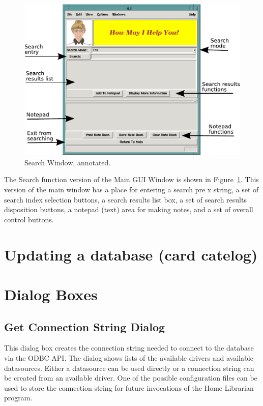 \begin{figure}[hpt]
\begin{centering}
\includegraphics[width=5in]{SearchWindowAnnotated.pdf}
\caption{Search Window, annotated.}
\label{fig:ref:searchwindowAnno}
\end{centering}
\end{figure}
The Search function version of the Main GUI Window is shown in
Figure~\ref{fig:ref:searchwindowAnno}. This version of the main window has
a place for entering a search pre x string, a set of search index
selection buttons, a search results list box, a set of search results
disposition buttons, a notepad (text) area for making notes, and a set
of overall control buttons.


\section{Updating a database (card catelog)}
\label{sect:ref:update}



\section{Dialog Boxes}
\subsection{Get Connection String Dialog}
This dialog box creates the connection string needed to connect to the
database via the ODBC API. The dialog shows lists of the available
drivers and available datasources.  Either a datasource can be used
directly or a connection string can be created from an available
driver. One of the possible configuration files can be used to store
the connection string for future invocations of the Home Librarian
program.
